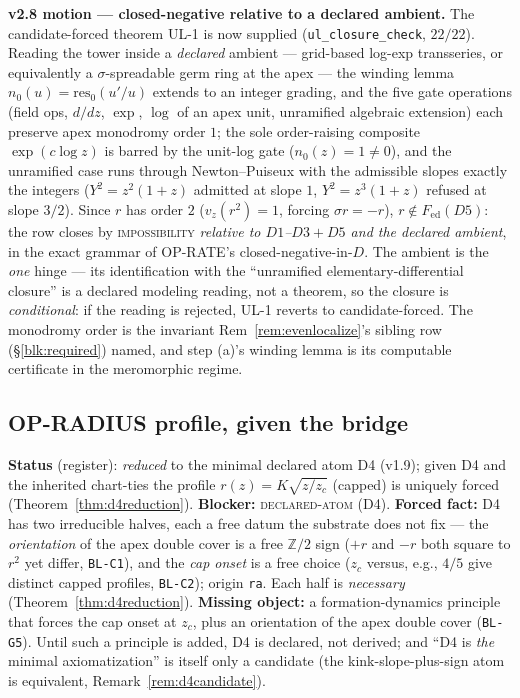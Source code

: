 \documentclass[11pt]{article}
\newcommand{\hx}[1]{\textcolor{cC}{\footnotesize\texttt{#1}}}
\newcommand{\Z}{\mathbb{Z}}
\theoremstyle{plain}
\theoremstyle{definition}
\theoremstyle{remark}
\begin{document}
\smallskip\noindent
\textbf{v2.8 motion --- closed-negative relative to a declared ambient.} The
candidate-forced theorem \textsc{UL-1} is now supplied (\texttt{ul\_closure\_check},
$22/22$). Reading the tower inside a \emph{declared} ambient --- grid-based log-exp
transseries, or equivalently a $\sigma$-spreadable germ ring at the apex --- the
winding lemma $n_0(u)=\mathrm{res}_0(u'/u)$ extends to an integer grading, and the
five gate operations (field ops, $d/dz$, $\exp$, $\log$ of an apex unit, unramified
algebraic extension) each preserve apex monodromy order $1$; the sole order-raising
composite $\exp(c\log z)$ is barred by the unit-log gate ($n_0(z)=1\ne0$), and the
unramified case runs through Newton--Puiseux with the admissible slopes exactly the
integers ($Y^2=z^2(1+z)$ admitted at slope $1$, $Y^2=z^3(1+z)$ refused at slope
$3/2$). Since $r$ has order $2$ ($v_z(r^2)=1$, forcing $\sigma r=-r$), $r\notin
F_{\mathrm{ed}}(D5)$: the row closes by \textsc{impossibility} \emph{relative to
$D1$--$D3+D5$ and the declared ambient}, in the exact grammar of OP-RATE's
closed-negative-in-$D$. The ambient is the \emph{one} hinge --- its identification
with the ``unramified elementary-differential closure'' is a declared modeling
reading, not a theorem, so the closure is \emph{conditional}: if the reading is
rejected, UL-1 reverts to candidate-forced. The monodromy order is the invariant
Rem~\ref{rem:evenlocalize}'s sibling row (\S\ref{blk:required}) named, and step (a)'s
winding lemma is its computable certificate in the meromorphic regime.

\subsection{OP-RADIUS profile, given the bridge}\label{blk:radprof}
\textbf{Status} (register): \emph{reduced} to the minimal declared atom D4 (v1.9);
given D4 and the inherited chart-ties the profile $r(z)=K\sqrt{z/z_c}$ (capped) is
uniquely forced (Theorem~\ref{thm:d4reduction}). \textbf{Blocker:}
\textsc{declared-atom} (D4). \textbf{Forced fact:} D4 has two irreducible halves,
each a free datum the substrate does not fix --- the \emph{orientation} of the
apex double cover is a free $\Z/2$ sign ($+r$ and $-r$ both square to $r^2$ yet
differ, \hx{BL-C1}), and the \emph{cap onset} is a free choice ($z_c$ versus,
e.g., $4/5$ give distinct capped profiles, \hx{BL-C2}); origin \texttt{ra}. Each
half is \emph{necessary} (Theorem~\ref{thm:d4reduction}). \textbf{Missing
object:} a formation-dynamics principle that forces the cap onset at $z_c$, plus
an orientation of the apex double cover (\hx{BL-G5}). Until such a principle is
added, D4 is declared, not derived; and ``D4 is \emph{the} minimal
axiomatization'' is itself only a candidate (the kink-slope-plus-sign atom is
equivalent, Remark~\ref{rem:d4candidate}).
\end{document}

